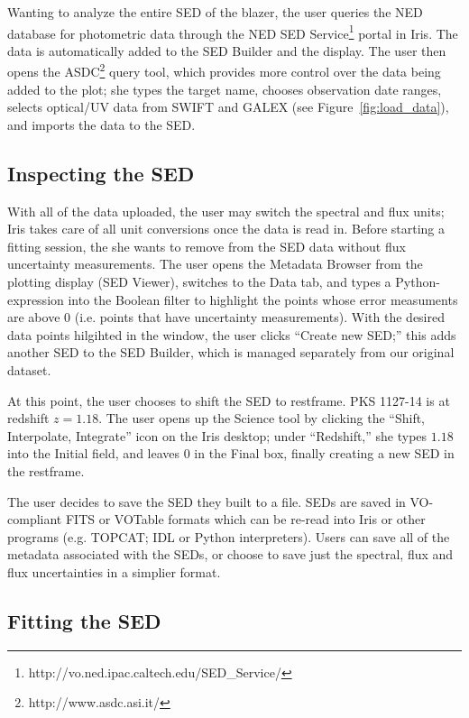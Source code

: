 \documentclass[preprint,12pt,3p]{elsarticle}
\begin{document}
Wanting to analyze the entire SED of the blazer, the user queries the NED database for photometric data through the NED SED Service\footnote{http://vo.ned.ipac.caltech.edu/SED\_Service/} portal in Iris. The data is automatically added to the SED Builder and the display. The user then opens the ASDC\footnote{http://www.asdc.asi.it/} query tool, which provides more control over the data being added to the plot; she types the target name, chooses observation date ranges, selects optical/UV data from SWIFT and GALEX (see Figure~\ref{fig:load_data}), and imports the data to the SED.

\subsection{Inspecting the SED}

With all of the data uploaded, the user may switch the spectral and flux units; Iris takes care of all unit conversions once the data is read in. Before starting a fitting session, the she wants to remove from the SED data without flux uncertainty measurements. The user opens the Metadata Browser from the plotting display (SED Viewer), switches to the Data tab, and types a Python-expression into the Boolean filter to highlight the points whose error measuments are above 0 (i.e. points that have uncertainty measurements). With the desired data points hilgihted in the window, the user clicks ``Create new SED;'' this adds another SED to the SED Builder, which is managed separately from our original dataset.

At this point, the user chooses to shift the SED to restframe. PKS 1127-14 is at redshift $z=1.18$. The user opens up the Science tool by clicking the ``Shift, Interpolate, Integrate'' icon on the Iris desktop; under ``Redshift,'' she types $1.18$ into the Initial field, and leaves 0 in the Final box, finally creating a new SED in the restframe.

The user decides to save the SED they built to a file. SEDs are saved in VO-compliant FITS or VOTable formats which can be re-read into Iris or other programs (e.g. TOPCAT; IDL or Python interpreters). Users can save all of the metadata associated with the SEDs, or choose to save just the spectral, flux and flux uncertainties in a simplier format.

\subsection{Fitting the SED}
\end{document}
